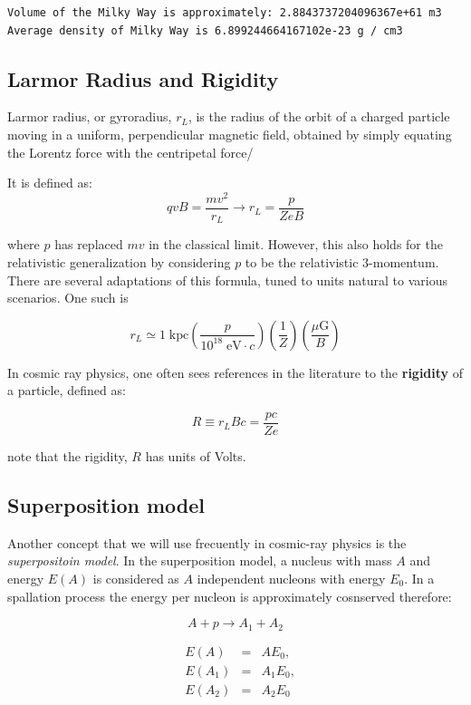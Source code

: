 \documentclass[
  letterpaper,
  DIV=11,
  numbers=noendperiod]{scrreprt}
\begin{document}
\begin{verbatim}
Volume of the Milky Way is approximately: 2.8843737204096367e+61 m3
Average density of Milky Way is 6.899244664167102e-23 g / cm3
\end{verbatim}

\subsection*{Larmor Radius and
Rigidity}\label{larmor-radius-and-rigidity}

Larmor radius, or gyroradius, \(r_L\), is the radius of the orbit of a
charged particle moving in a uniform, perpendicular magnetic field,
obtained by simply equating the Lorentz force with the centripetal
force/

It is defined as:
\[q v B = \frac{mv^2}{r_L} \rightarrow r_L = \frac{p}{ZeB}\]

where \(p\) has replaced \(mv\) in the classical limit. However, this
also holds for the relativistic generalization by considering \(p\) to
be the relativistic 3-momentum. There are several adaptations of this
formula, tuned to units natural to various scenarios. One such is

\[r_L \simeq  1 \;\mathrm{ kpc} \left(\frac{p}{10^{18}\;\mathrm{ eV}\cdot{c}}\right)\left(\frac{1}{Z}\right)\left(\frac{\mu\mathrm{ G}}{B}\right)\]

In cosmic ray physics, one often sees references in the literature to
the \textbf{rigidity} of a particle, defined as:

\[
R \equiv r_L B c = \frac{pc}{Ze}
\]

note that the rigidity, \(R\) has units of Volts.

\subsection*{Superposition model}\label{superposition-model}

Another concept that we will use frecuently in cosmic-ray physics is the
\emph{superpositoin model}. In the superposition model, a nucleus with
mass \(A\) and energy \(E(A)\) is considered as \(A\) independent
nucleons with energy \(E_0\). In a spallation process the energy per
nucleon is approximately cosnserved therefore:

\[A + p \rightarrow A_1 + A_2\]

\[\begin{alignedat}{2}
&E(A) &= &A E_0,\\
&E(A_1) &= &A_1 E_0,\\
&E(A_2) &= &A_2 E_0
\end{alignedat}\]
\end{document}
